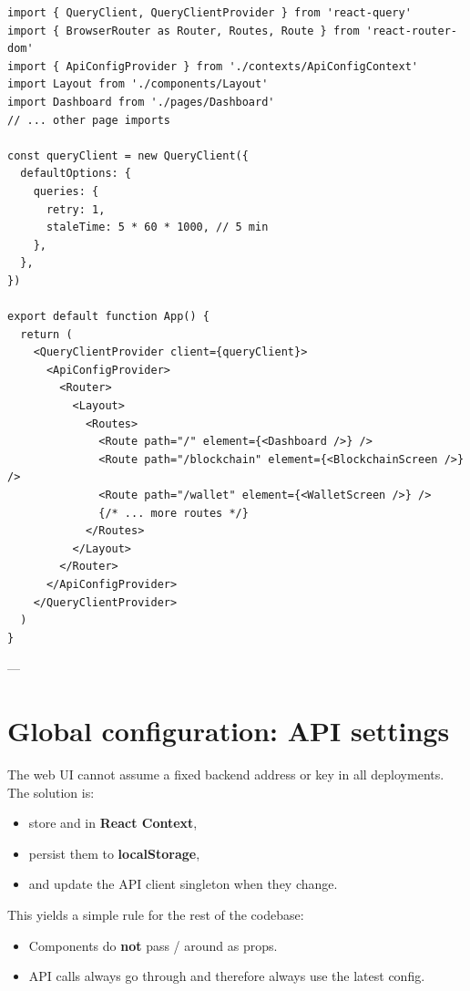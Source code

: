 \begin{listing}[htbp]
\caption{Application root with providers and routing}
\label{lst:ch21-app}
\begin{verbatim}
import { QueryClient, QueryClientProvider } from 'react-query'
import { BrowserRouter as Router, Routes, Route } from 'react-router-dom'
import { ApiConfigProvider } from './contexts/ApiConfigContext'
import Layout from './components/Layout'
import Dashboard from './pages/Dashboard'
// ... other page imports

const queryClient = new QueryClient({
  defaultOptions: {
    queries: {
      retry: 1,
      staleTime: 5 * 60 * 1000, // 5 min
    },
  },
})

export default function App() {
  return (
    <QueryClientProvider client={queryClient}>
      <ApiConfigProvider>
        <Router>
          <Layout>
            <Routes>
              <Route path="/" element={<Dashboard />} />
              <Route path="/blockchain" element={<BlockchainScreen />} />
              <Route path="/wallet" element={<WalletScreen />} />
              {/* ... more routes */}
            </Routes>
          </Layout>
        </Router>
      </ApiConfigProvider>
    </QueryClientProvider>
  )
}
\end{verbatim}
\end{listing}

---

\section{Global configuration: API settings}
\label{sec:api-config}

The web UI cannot assume a fixed backend address or key in all deployments. The solution is:

\begin{itemize}
  \item store  and  in \textbf{React Context},
  \item persist them to \textbf{localStorage},
  \item and update the API client singleton when they change.
\end{itemize}

This yields a simple rule for the rest of the codebase:

\begin{itemize}
  \item Components do \textbf{not} pass / around as props.
  \item API calls always go through  and therefore always use the latest config.
\end{itemize}

